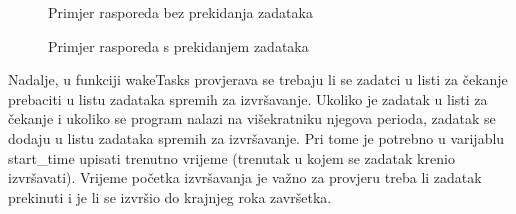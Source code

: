\documentclass[../zavrsni.tex]{subfiles}
\begin{document}
\begin{figure}[h]
  \centering

    \begin{RTGrid}[width=7cm]{3}{8}

  



  


    \end{RTGrid}

    \caption{Primjer rasporeda bez prekidanja zadataka}
    \label{fig:ex1}
  \end{figure}

  \begin{figure}[h]
    \centering

    \begin{RTGrid}[width=7cm]{3}{8}


  



  


    \end{RTGrid}

    \caption{Primjer rasporeda s prekidanjem zadataka}
    \label{fig:ex1}
  \end{figure}

Nadalje, u funkciji wakeTasks provjerava se trebaju li se zadatci u listi za čekanje prebaciti u listu zadataka spremih za izvršavanje.
Ukoliko je zadatak u listi za čekanje i ukoliko se program nalazi na višekratniku njegova perioda, zadatak se dodaju u listu 
zadataka spremih za izvršavanje. Pri tome je potrebno u varijablu start\_time upisati trenutno vrijeme (trenutak u kojem se zadatak 
krenio izvršavati). Vrijeme početka izvršavanja je važno za provjeru treba li zadatak prekinuti i je li se izvršio do krajnjeg roka 
završetka.
\end{document}
